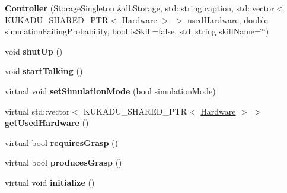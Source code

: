 \begin{DoxyCompactItemize}
\item 
{\bfseries Controller} (\hyperlink{classkukadu_1_1StorageSingleton}{Storage\+Singleton} \&db\+Storage, std\+::string caption, std\+::vector$<$ K\+U\+K\+A\+D\+U\+\_\+\+S\+H\+A\+R\+E\+D\+\_\+\+P\+TR$<$ \hyperlink{classkukadu_1_1Hardware}{Hardware} $>$ $>$ used\+Hardware, double simulation\+Failing\+Probability, bool is\+Skill=false, std\+::string skill\+Name=\char`\"{}\char`\"{})\hypertarget{classkukadu_1_1Controller_af6f6a6174bbce460a82570b3d1f18f3c}{}\label{classkukadu_1_1Controller_af6f6a6174bbce460a82570b3d1f18f3c}

\item 
void {\bfseries shut\+Up} ()\hypertarget{classkukadu_1_1Controller_aa27eb73a93a2d59bc0ebe15baf28bea0}{}\label{classkukadu_1_1Controller_aa27eb73a93a2d59bc0ebe15baf28bea0}

\item 
void {\bfseries start\+Talking} ()\hypertarget{classkukadu_1_1Controller_a1973596dea74a0706e275f044ca190b0}{}\label{classkukadu_1_1Controller_a1973596dea74a0706e275f044ca190b0}

\item 
virtual void {\bfseries set\+Simulation\+Mode} (bool simulation\+Mode)\hypertarget{classkukadu_1_1Controller_a888ebe1be866cb19e4c8f50eaded5bb9}{}\label{classkukadu_1_1Controller_a888ebe1be866cb19e4c8f50eaded5bb9}

\item 
virtual std\+::vector$<$ K\+U\+K\+A\+D\+U\+\_\+\+S\+H\+A\+R\+E\+D\+\_\+\+P\+TR$<$ \hyperlink{classkukadu_1_1Hardware}{Hardware} $>$ $>$ {\bfseries get\+Used\+Hardware} ()\hypertarget{classkukadu_1_1Controller_a1dbcbec07e0189e26275f1db57f4baf3}{}\label{classkukadu_1_1Controller_a1dbcbec07e0189e26275f1db57f4baf3}

\item 
virtual bool {\bfseries requires\+Grasp} ()\hypertarget{classkukadu_1_1Controller_a20240ff89fb6a2582024140d388fd335}{}\label{classkukadu_1_1Controller_a20240ff89fb6a2582024140d388fd335}

\item 
virtual bool {\bfseries produces\+Grasp} ()\hypertarget{classkukadu_1_1Controller_ad28145aa06ce1cfe4bccddff42459019}{}\label{classkukadu_1_1Controller_ad28145aa06ce1cfe4bccddff42459019}

\item 
virtual void {\bfseries initialize} ()\hypertarget{classkukadu_1_1Controller_a74a2a16a16104b1bf16ad5eae443e968}{}\label{classkukadu_1_1Controller_a74a2a16a16104b1bf16ad5eae443e968}


\end{DoxyCompactItemize}
